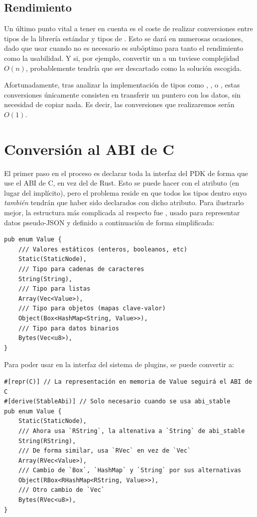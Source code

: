 \subsection{Rendimiento}\label{abiperf}

Un último punto vital a tener en cuenta es el coste de realizar conversiones
entre tipos de la librería estándar y tipos de \abistable. Esto se dará en
numerosas ocasiones, dado que usar \abistable cuando no es necesario es
subóptimo para tanto el rendimiento como la usabilidad. Y si, por ejemplo,
convertir un  a un  tuviese complejidad $O(n)$,
probablemente \abistable tendría que ser descartado como la solución escogida.

Afortunadamente, tras analizar la implementación de tipos como ,
,  o , estas conversiones únicamente
consisten en transferir un puntero con los datos, sin necesidad de copiar nada.
Es decir, las conversiones que realizaremos serán $O(1)$.

\section{Conversión al ABI de C}

El primer paso en el proceso es declarar toda la interfaz del PDK de forma que
use el ABI de C, en vez del de Rust. Esto se puede hacer con el atributo
\rust{#[repr(C)]} (en lugar del  implícito), pero el
problema reside en que todos los tipos dentro suyo \emph{también} tendrán que
haber sido declarados con dicho atributo. Para ilustrarlo mejor, la estructura
más complicada al respecto fue , usado para representar datos
pseudo-JSON y definido a continuación de forma simplificada:

\begin{verbatim}
pub enum Value {
    /// Valores estáticos (enteros, booleanos, etc)
    Static(StaticNode),
    /// Tipo para cadenas de caracteres
    String(String),
    /// Tipo para listas
    Array(Vec<Value>),
    /// Tipo para objetos (mapas clave-valor)
    Object(Box<HashMap<String, Value>>),
    /// Tipo para datos binarios
    Bytes(Vec<u8>),
}
\end{verbatim}

Para poder usar  en la interfaz del sistema de plugins, se puede
convertir a:

\begin{verbatim}
#[repr(C)] // La representación en memoria de Value seguirá el ABI de C
#[derive(StableAbi)] // Solo necesario cuando se usa abi_stable
pub enum Value {
    Static(StaticNode),
    /// Ahora usa `RString`, la altenativa a `String` de abi_stable
    String(RString),
    /// De forma similar, usa `RVec` en vez de `Vec`
    Array(RVec<Value>),
    /// Cambio de `Box`, `HashMap` y `String` por sus alternativas
    Object(RBox<RHashMap<RString, Value>>),
    /// Otro cambio de `Vec`
    Bytes(RVec<u8>),
}
\end{verbatim}

